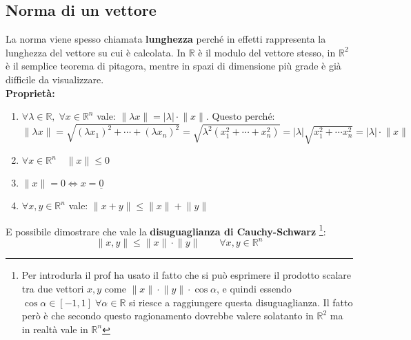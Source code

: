 \subsection{Norma di un vettore} \label{sec_norma}
La norma viene spesso chiamata \textbf{lunghezza} perché in effetti rappresenta 
la lunghezza del vettore su cui è calcolata. In $\mathbb{R}$ è il modulo del 
vettore stesso, in $\mathbb{R}^2$ è il semplice teorema di pitagora, mentre in 
spazi di dimensione più grade è già difficile da visualizzare.\\

\textbf{Proprietà:} 
\begin{enumerate}
	\item $\forall \lambda \in \mathbb{R}, \;\forall x \in \mathbb{R}^n$ vale: 
        $\lVert \lambda x \rVert = |\lambda| \cdot \lVert x \rVert$. Questo 
        perché:
		\begin{equation*}
			\lVert \lambda x \rVert = \sqrt{(\lambda x_1)^2 + \cdots + 
            (\lambda x_n)^2} = \sqrt{\lambda^2 (x_1^2 + \cdots + x_n^2)} = 
            |\lambda| \sqrt{x_1^2 + \cdots x_n^2} = |\lambda| \cdot \lVert x 
            \rVert
		\end{equation*}
	
	\item $\forall x \in \mathbb{R}^n \quad \lVert x \rVert \leq 0$
	
	\item $\lVert x \rVert = 0 \iff x = \underline{0}$

	\item $\forall x, y \in \mathbb{R}^n$ vale: $\lVert x + y \rVert \leq 
        \lVert x \rVert + \lVert y \rVert$
\end{enumerate}

E possibile dimostrare che vale la \textbf{disuguaglianza di Cauchy-Schwarz}
\footnote{Per introdurla il prof ha usato il fatto che si può esprimere il 
prodotto scalare tra due vettori $x, y$ come $\lVert x \rVert \cdot \lVert y 
\rVert \cdot \cos{\alpha}$, e quindi essendo $\cos{\alpha} \in [-1, 1] \; 
\forall \alpha \in \mathbb{R}$ si riesce a raggiungere questa disuguaglianza. 
Il fatto però è che secondo questo ragionamento dovrebbe valere solatanto in 
$\mathbb{R}^2$ ma in realtà vale in $\mathbb{R}^n$}:
\begin{equation*}
	\lVert x, y \rVert \leq \lVert x \rVert \cdot \lVert y \rVert \qquad 
    \forall x, y \in \mathbb{R}^n
\end{equation*}

